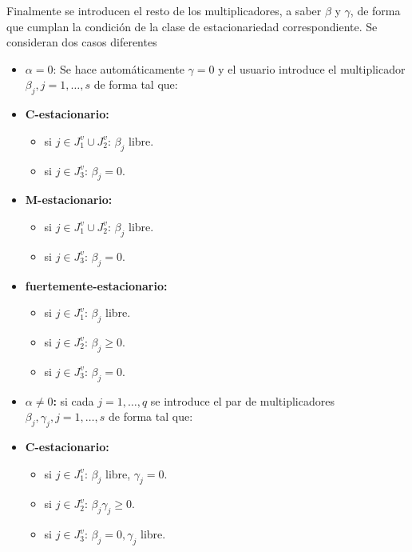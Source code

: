 Finalmente se introducen el resto de los multiplicadores,  a saber $\beta$ y $\gamma$,  de forma que cumplan la condición de la clase de estacionariedad correspondiente. Se consideran dos casos diferentes
\begin{itemize}
\item {\textbf{ $\alpha=0$}}: Se hace automáticamente $\gamma =0$   y el  usuario introduce el multiplicador $\beta_j, j=1,\ldots,s $ de forma tal que: 

\item[]\begin{center} {\textbf{ C-estacionario:}} \end{center}\begin{itemize}\item si $j\in J_1^v\cup J_2^v$: $\beta_j$ libre.\item si $j\in J_3^v$: $\beta_j=0$.\end{itemize}
\item[]\begin{center} {\textbf{ M-estacionario:}} \end{center}\begin{itemize}\item si $j\in J_1^v\cup J_2^v$: $\beta_j$ libre.\item si $j\in J_3^v$: $\beta_j=0$.\end{itemize}
\item[]\begin{center} {\textbf{ fuertemente-estacionario:}} \end{center}\begin{itemize}\item si $j\in J_1^v$: $\beta_j$ libre.\item si $j\in J_2^v$: $\beta_j\geq 0$.\item si $j\in J_3^v$: $\beta_j=0$.
\end{itemize}
\item  {\textbf{$\alpha\neq 0$:}} si cada $j=1,\ldots,q$ se introduce el par de multiplicadores $\beta_j, \gamma_j, j=1,\ldots,s$ de forma tal que: 
\item[]\begin{center} {\textbf{ C-estacionario:}} \end{center}\begin{itemize}\item si $j\in J_1^v$: $\beta_j$ libre, $\gamma_j=0$.\item si $j\in J_2^v$: $\beta_j\gamma_j\geq 0$.\item si $j\in J_3^v$: $\beta_j=0,\gamma_j$ libre.\end{itemize}

\end{itemize}
